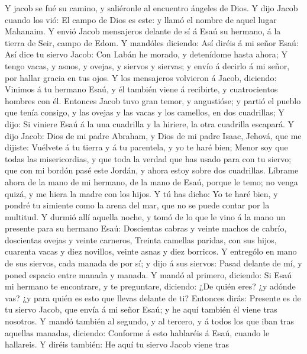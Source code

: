  Y jacob se fué su camino, y saliéronle al encuentro ángeles
de Dios.  Y dijo Jacob cuando los vió: El campo de Dios es
este: y llamó el nombre de aquel lugar Mahanaim.  Y envió
Jacob mensajeros delante de sí á Esaú su hermano, á la tierra de Seir,
campo de Edom.  Y mandóles diciendo: Así diréis á mi señor
Esaú: Así dice tu siervo Jacob: Con Labán he morado, y detenídome hasta
ahora;  Y tengo vacas, y asnos, y ovejas, y siervos y
siervas; y envío á decirlo á mi señor, por hallar gracia en tus ojos.
 Y los mensajeros volvieron á Jacob, diciendo: Vinimos á tu
hermano Esaú, y él también viene á recibirte, y cuatrocientos hombres
con él.  Entonces Jacob tuvo gran temor, y angustióse; y
partió el pueblo que tenía consigo, y las ovejas y las vacas y los
camellos, en dos cuadrillas;  Y dijo: Si viniere Esaú á la
una cuadrilla y la hiriere, la otra cuadrilla escapará.  Y
dijo Jacob: Dios de mi padre Abraham, y Dios de mi padre Isaac, Jehová,
que me dijiste: Vuélvete á tu tierra y á tu parentela, y yo te haré
bien;  Menor soy que todas las misericordias, y que toda la
verdad que has usado para con tu siervo; que con mi bordón pasé este
Jordán, y ahora estoy sobre dos cuadrillas.  Líbrame ahora
de la mano de mi hermano, de la mano de Esaú, porque le temo; no venga
quizá, y me hiera la madre con los hijos.  Y tú has dicho:
Yo te haré bien, y pondré tu simiente como la arena del mar, que no se
puede contar por la multitud.  Y durmió allí aquella noche,
y tomó de lo que le vino á la mano un presente para su hermano Esaú:
 Doscientas cabras y veinte machos de cabrío, doscientas
ovejas y veinte carneros,  Treinta camellas paridas, con
sus hijos, cuarenta vacas y diez novillos, veinte asnas y diez borricos.
 Y entrególo en mano de sus siervos, cada manada de por sí;
y dijo á sus siervos: Pasad delante de mí, y poned espacio entre manada
y manada.  Y mandó al primero, diciendo: Si Esaú mi hermano
te encontrare, y te preguntare, diciendo: ¿De quién eres? ¿y adónde vas?
¿y para quién es esto que llevas delante de ti?  Entonces
dirás: Presente es de tu siervo Jacob, que envía á mi señor Esaú; y he
aquí también él viene tras nosotros.  Y mandó también al
segundo, y al tercero, y á todos los que iban tras aquellas manadas,
diciendo: Conforme á esto hablaréis á Esaú, cuando le hallareis.
 Y diréis también: He aquí tu siervo Jacob viene tras
